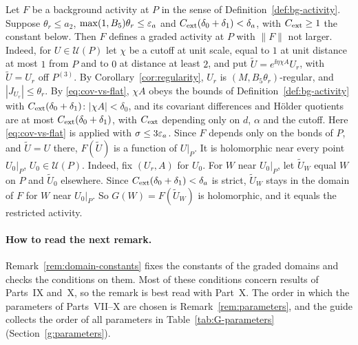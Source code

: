 \begin{remark}
\begin{enumerate}[label=(\alph*)]
\end{enumerate}
\end{remark}

\begin{remark}\label{rem:bg-to-graded}
Let $F$ be a background activity at $P$ in the sense of Definition~\ref{def:bg-activity}. Suppose $\theta_r\le a_2$, $\max(1,B_5)\theta_r\le\varepsilon_a$ and $C_{\rm ext}(\delta_0+\delta_1)<\delta_a$, with $C_{\rm ext}\ge1$ the constant below. Then $F$ defines a graded activity at $P$ with $\|F\|$ not larger. Indeed, for $U\in\mathcal U(P)$ let $\chi$ be a cutoff at unit scale, equal to $1$ at unit distance at most $1$ from $P$ and to $0$ at distance at least $2$, and put $\tilde U=e^{\ii\eta\chi A}U_r$, with $\tilde U=U_r$ off $P^{(3)}$. By Corollary~\ref{cor:regularity}, $U_r$ is $(M,B_5\theta_r)$-regular, and $|J_{U_r}|\le\theta_r$. By \eqref{eq:cov-vs-flat}, $\chi A$ obeys the bounds of Definition~\ref{def:bg-activity} with $C_{\rm ext}(\delta_0+\delta_1)$: $|\chi A|<\delta_0$, and its covariant differences and H\"older quotients are at most $C_{\rm ext}(\delta_0+\delta_1)$, with $C_{\rm ext}$ depending only on $d$, $\alpha$ and the cutoff. Here \eqref{eq:cov-vs-flat} is applied with $\sigma\le3\varepsilon_a$. Since $F$ depends only on the bonds of $P$, and $\tilde U=U$ there, $F(\tilde U)$ is a function of $U|_P$. It is holomorphic near every point $U_0|_P$, $U_0\in\mathcal U(P)$. Indeed, fix $(U_r,A)$ for $U_0$. For $W$ near $U_0|_P$, let $\tilde U_W$ equal $W$ on $P$ and $\tilde U_0$ elsewhere. Since $C_{\rm ext}(\delta_0+\delta_1)<\delta_a$ is strict, $\tilde U_W$ stays in the domain of $F$ for $W$ near $U_0|_P$. So $G(W)=F(\tilde U_W)$ is holomorphic, and it equals the restricted activity.
\end{remark}

\paragraph{How to read the next remark.} Remark~\ref{rem:domain-constants} fixes the constants of the graded domains and checks the conditions on them. Most of these conditions concern results of Parts~IX and~X, so the remark is best read with Part~X. The order in which the parameters of Parts~VII--X are chosen is Remark~\ref{rem:parameters}, and the guide collects the order of all parameters in Table~\ref{tab:G-parameters} (Section~\ref{g:parameters}).

